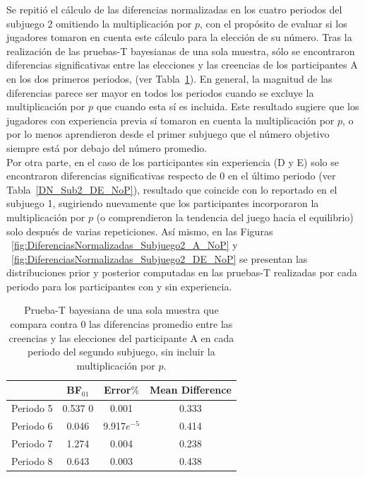 Se repitió el cálculo de las diferencias normalizadas en los cuatro periodos del subjuego 2 omitiendo la multiplicación por $p$, con el propósito de evaluar si los jugadores tomaron en cuenta este cálculo para la elección de su número. Tras la realización de las pruebas-T bayesianas de una sola muestra,  sólo se encontraron diferencias significativas entre las elecciones y las creencias de los participantes A en los dos primeros  periodos, (ver Tabla~\ref{DN_Sub2_A_NoP}). En general, la magnitud de las diferencias parece ser mayor en todos los periodos cuando se excluye la multiplicación por $p$ que cuando esta sí es incluida. Este resultado sugiere que los jugadores con experiencia previa sí tomaron en cuenta la multiplicación por $p$, o por lo menos aprendieron desde el primer subjuego que el número objetivo siempre está por debajo del número promedio.\\

Por otra parte, en el caso de los participantes sin experiencia (D y E) solo se encontraron diferencias significativas respecto de $0$ en el último periodo (ver Tabla~\ref{DN_Sub2_DE_NoP}), resultado que coincide con lo reportado en el subjuego 1, sugiriendo nuevamente que los participantes incorporaron la multiplicación por $p$ (o comprendieron la tendencia del juego hacia el equilibrio)  solo después de varias repeticiones. Así mismo, en las Figuras ~\ref{fig:DiferenciasNormalizadas_Subjuego2_A_NoP} y ~\ref{fig:DiferenciasNormalizadas_Subjuego2_DE_NoP} se presentan las distribuciones prior y posterior computadas en las pruebas-T realizadas por cada periodo para los participantes con y sin experiencia.\\


\begin{table}
\caption[Diferencias Normalizadas en el Subjuego 2, omitiendo la multiplicación $\cdot p$ (Participantes A)]{Prueba-T bayesiana de una sola muestra que compara contra 0 las diferencias promedio entre las creencias y las elecciones del participante A en cada periodo del segundo subjuego, sin incluir la multiplicación por $p$.}
\label{DN_Sub2_A_NoP}
\centering
\begin{tabular}{l | c c c}  %
\toprule
\textbf{} & \textbf{BF$_{01}$} & \textbf{Error$\%$} & \textbf{Mean Difference}\\
\midrule
Periodo 5 & 0.537 0& 0.001 & 0.333 \\
Periodo 6 & 0.046 & 9.917$e^{-5}$ & 0.414 \\
Periodo 7 & 1.274 & 0.004 & 0.238 \\
Periodo 8 & 0.643 & 0.003 & 0.438 \\
\bottomrule
\end{tabular}
\end{table}

